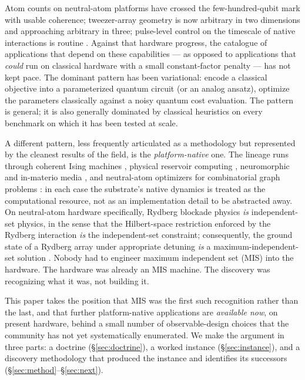 \documentclass[10pt]{article}
\begin{document}
Atom counts on neutral-atom platforms have crossed the few-hundred-qubit mark with usable coherence; tweezer-array geometry is now arbitrary in two dimensions and approaching arbitrary in three; pulse-level control on the timescale of native interactions is routine \cite{henriet2020quantum,silverio2022pulser}. Against that hardware progress, the catalogue of applications that depend on these capabilities --- as opposed to applications that \emph{could} run on classical hardware with a small constant-factor penalty --- has not kept pace. The dominant pattern has been variational: encode a classical objective into a parameterized quantum circuit (or an analog ansatz), optimize the parameters classically against a noisy quantum cost evaluation. The pattern is general; it is also generally dominated by classical heuristics on every benchmark on which it has been tested at scale.

A different pattern, less frequently articulated as a methodology but represented by the cleanest results of the field, is the \emph{platform-native} one. The lineage runs through coherent Ising machines \cite{mohseni2022isingmachines}, physical reservoir computing \cite{tanaka2019reservoir}, neuromorphic and in-materio media \cite{markovic2020physicsai}, and neutral-atom optimizers for combinatorial graph problems \cite{ebadi2022quantum,henriet2020quantum}: in each case the substrate's native dynamics is treated as the computational resource, not as an implementation detail to be abstracted away. On neutral-atom hardware specifically, Rydberg blockade physics \emph{is} independent-set physics, in the sense that the Hilbert-space restriction enforced by the Rydberg interaction \emph{is} the independent-set constraint; consequently, the ground state of a Rydberg array under appropriate detuning \emph{is} a maximum-independent-set solution \cite{ebadi2022quantum}. Nobody had to engineer maximum independent set (MIS) into the hardware. The hardware was already an MIS machine. The discovery was recognizing what it was, not building it.

This paper takes the position that MIS was the first such recognition rather than the last, and that further platform-native applications are \emph{available now}, on present hardware, behind a small number of observable-design choices that the community has not yet systematically enumerated. We make the argument in three parts: a doctrine (\S\ref{sec:doctrine}), a worked instance (\S\ref{sec:instance}), and a discovery methodology that produced the instance and identifies its successors (\S\ref{sec:method}--\S\ref{sec:next}).
\end{document}
